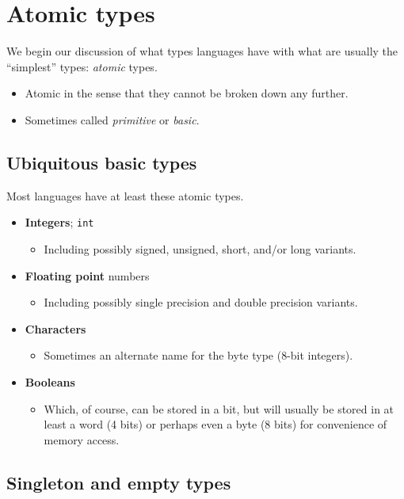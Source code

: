 \documentclass[11pt]{article}
\theoremstyle{definition}
\begin{document}
\section{Atomic types}
\label{sec:org9098990}

We begin our discussion of what types languages have
with what are usually the “simplest” types: \emph{atomic} types.
\begin{itemize}
\item Atomic in the sense that they cannot be broken down any further.
\item Sometimes called \emph{primitive} or \emph{basic}.
\end{itemize}

\subsection{Ubiquitous basic types}
\label{sec:orgfaa19f5}

Most languages have at least these atomic types.
\begin{itemize}
\item \textbf{Integers}; \texttt{int}
\begin{itemize}
\item Including possibly signed, unsigned, short, and/or long variants.
\end{itemize}
\item \textbf{Floating point} numbers
\begin{itemize}
\item Including possibly single precision and double precision variants.
\end{itemize}
\item \textbf{Characters}
\begin{itemize}
\item Sometimes an alternate name for the byte type (8-bit integers).
\end{itemize}
\item \textbf{Booleans}
\begin{itemize}
\item Which, of course, can be stored in a bit,
but will usually be stored in at least a word (4 bits)
or perhaps even a byte (8 bits)
for convenience of memory access.
\end{itemize}
\end{itemize}

\subsection{Singleton and empty types}
\label{sec:orga3d1a18}
\end{document}
